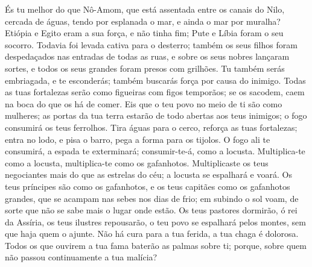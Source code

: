 És tu melhor do que Nô-Amom, que está assentada entre os canais do
Nilo, cercada de águas, tendo por esplanada o mar, e ainda o mar por
muralha? Etiópia e Egito eram a sua força, e não tinha fim; Pute
e Líbia foram o seu socorro. Todavia foi levada cativa para o
desterro; também os seus filhos foram despedaçados nas entradas de
todas as ruas, e sobre os seus nobres lançaram sortes, e todos os
seus grandes foram presos com grilhões. Tu também serás
embriagada, e te esconderás; também buscarás força por causa do
inimigo. Todas as tuas fortalezas serão como figueiras com
figos temporãos; se os sacodem, caem na boca do que os há de comer.
Eis que o teu povo no meio de ti são como mulheres; as portas
da tua terra estarão de todo abertas aos teus inimigos; o fogo
consumirá os teus ferrolhos. Tira águas para o cerco, reforça
as tuas fortalezas; entra no lodo, e pisa o barro, pega a forma para
os tijolos. O fogo ali te consumirá, a espada te exterminará;
consumir-te-á, como a locusta. Multiplica-te como a locusta,
multiplica-te como os gafanhotos. Multiplicaste os teus
negociantes mais do que as estrelas do céu; a locusta se espalhará e
voará. Os teus príncipes são como os gafanhotos, e os teus
capitães como os gafanhotos grandes, que se acampam nas sebes nos
dias de frio; em subindo o sol voam, de sorte que não se sabe mais o
lugar onde estão. Os teus pastores dormirão, ó rei da
Assíria, os teus ilustres repousarão, o teu povo se espalhará pelos
montes, sem que haja quem o ajunte. Não há cura para a tua
ferida, a tua chaga é dolorosa. Todos os que ouvirem a tua fama
baterão as palmas sobre ti; porque, sobre quem não passou
continuamente a tua malícia?


